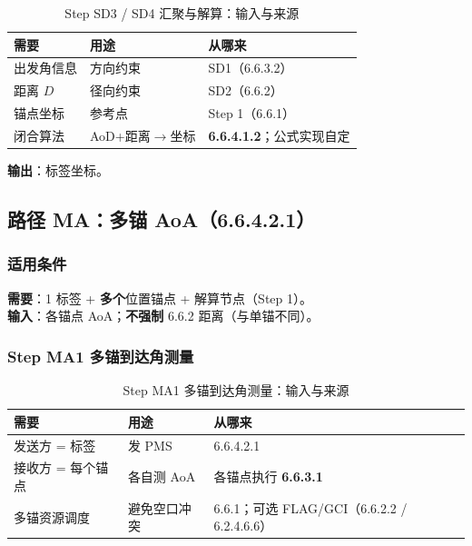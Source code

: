 \documentclass[11pt,a4paper]{ctexart}
\begin{document}
\begin{longtable}{L{3.4cm}L{4.8cm}L{4.8cm}}
\caption{Step SD3 / SD4 汇聚与解算：输入与来源\label{tab:step128}} \\
\toprule
\textbf{需要} & \textbf{用途} & \textbf{从哪来} \\
\midrule
出发角信息 & 方向约束 & SD1（6.6.3.2） \\
距离 $D$ & 径向约束 & SD2（6.6.2） \\
锚点坐标 & 参考点 & Step 1（6.6.1） \\
闭合算法 & AoD+距离$\rightarrow$坐标 & \textbf{6.6.4.1.2}；公式实现自定 \\
\bottomrule
\end{longtable}

\textbf{输出}：标签坐标。

\subsection{路径 MA：多锚 AoA（6.6.4.2.1）}
\label{sec:ma}

\subsubsection{适用条件}

\textbf{需要}：1 标签 + \textbf{多个}位置锚点 + 解算节点（Step 1）。\\
\textbf{输入}：各锚点 AoA；\textbf{不强制} 6.6.2 距离（与单锚不同）。

\subsubsection{Step MA1 多锚到达角测量}

\begin{longtable}{L{3.4cm}L{4.8cm}L{4.8cm}}
\caption{Step MA1 多锚到达角测量：输入与来源\label{tab:step129}} \\
\toprule
\textbf{需要} & \textbf{用途} & \textbf{从哪来} \\
\midrule
发送方 = 标签 & 发 PMS & 6.6.4.2.1 \\
接收方 = 每个锚点 & 各自测 AoA & 各锚点执行 \textbf{6.6.3.1} \\
多锚资源调度 & 避免空口冲突 & 6.6.1；可选 FLAG/GCI（6.6.2.2 / 6.2.4.6.6） \\
\bottomrule
\end{longtable}
\end{document}
